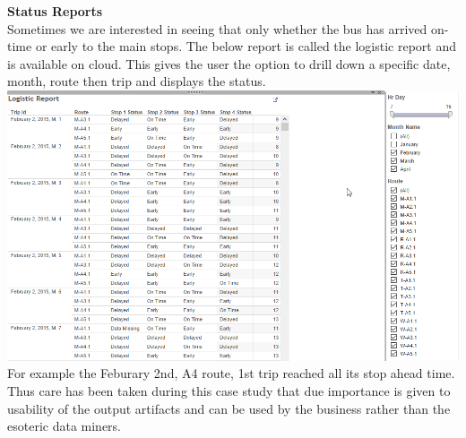 \documentclass[12pt]{article}
\begin{document}
\textbf{Status Reports}\\
Sometimes we are interested in seeing that only whether the bus has arrived on-time or early to the main stops. The below report is called the logistic report and is available on cloud. This gives the user the option to drill down a specific date, month, route then trip and displays the status.\\
\includegraphics[scale=0.55]{resources/tableau6}\\[1cm] 
For example the Feburary 2nd, A4 route, 1st trip reached all its stop ahead time.\\
Thus care has been taken during this case study that due importance is given to usability of the output artifacts and can be used by the business rather than the esoteric data miners.
\end{document}
